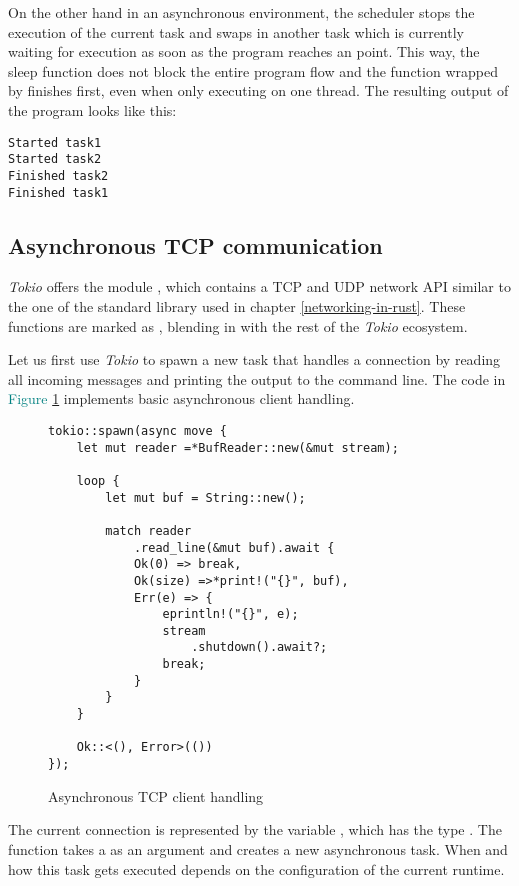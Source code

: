 On the other hand in an asynchronous environment, the scheduler stops the execution of the current task and swaps in
another task which is currently waiting for execution as soon as the program reaches an  point. This way,
the sleep function does not block the entire program flow and the function wrapped by  finishes first,
even when only executing on one thread. The resulting output of the program looks like this:

\begin{verbatim}
Started task1
Started task2
Finished task2
Finished task1
\end{verbatim}

\subsection{Asynchronous TCP communication}
\textit{Tokio} offers the module , which contains a TCP and UDP network API similar to the one of the
standard library used in chapter \ref{networking-in-rust}. These functions are marked as , blending in with
the rest of the \textit{Tokio} ecosystem.

Let us first use \textit{Tokio} to spawn a new task that handles a connection by reading all incoming messages and
printing the output to the command line. The code in \textcolor{teal}{Figure \ref{async-tcp-client-handling}}
implements basic asynchronous client handling.

\begin{figure}[ht]
    \begin{verbatim}
tokio::spawn(async move {
    let mut reader =*BufReader::new(&mut stream);

    loop {
        let mut buf = String::new();

        match reader
            .read_line(&mut buf).await {
            Ok(0) => break,
            Ok(size) =>*print!("{}", buf),
            Err(e) => {
                eprintln!("{}", e);
                stream
                    .shutdown().await?;
                break;
            }
        }
    }

    Ok::<(), Error>(())
});
    \end{verbatim}
    \caption{Asynchronous TCP client handling}
    \label{async-tcp-client-handling}
\end{figure}

The current connection is represented by the variable , which has the type .
The function  takes a  as an argument and creates a new asynchronous task. When and how
this task gets executed depends on the configuration of the current runtime.

